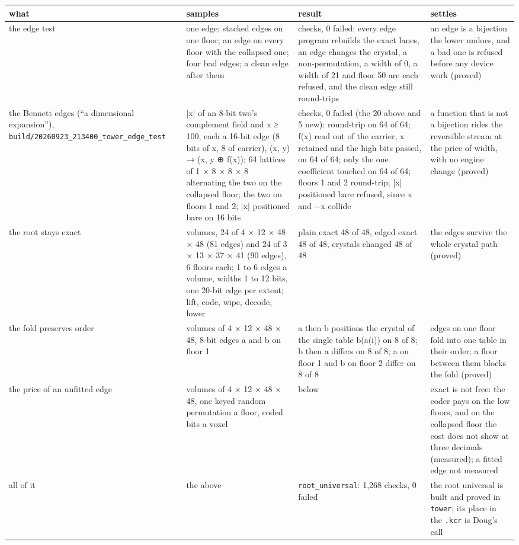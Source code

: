 {\footnotesize
\setlength{\tabcolsep}{6pt}
\begin{longtable}{>{\RaggedRight\arraybackslash}p{}>{\RaggedRight\arraybackslash}p{}>{\RaggedRight\arraybackslash}p{}>{\RaggedRight\arraybackslash}p{}}
\toprule
what & samples & result & settles \\
\midrule
\endhead
the edge test & one edge; stacked edges on one floor; an edge on every floor with the collapsed one; four bad edges; a clean edge after them & 20 checks, 0 failed: every edge program rebuilds the exact lanes, an edge changes the crystal, a non-permutation, a width of 0, a width of 21 and floor 50 are each refused, and the clean edge still round-trips & an edge is a bijection the lower undoes, and a bad one is refused before any device work (proved) \\
the Bennett edges (“a dimensional expansion”), \texttt{build/\allowbreak{}20260923\_\allowbreak{}213400\_\allowbreak{}tower\_\allowbreak{}edge\_\allowbreak{}test} & |x| of an 8-bit two's complement field and x ≥ 100, each a 16-bit edge (8 bits of x, 8 of carrier), (x, y) → (x, y ⊕ f(x)); 64 lattices of 1 × 8 × 8 × 8 alternating the two on the collapsed floor; the two on floors 1 and 2; |x| positioned bare on 16 bits & 25 checks, 0 failed (the 20 above and 5 new): round-trip on 64 of 64; f(x) read out of the carrier, x retained and the high bits passed, on 64 of 64; only the one coefficient touched on 64 of 64; floors 1 and 2 round-trip; |x| positioned bare refused, since x and −x collide & a function that is not a bijection rides the reversible stream at the price of width, with no engine change (proved) \\
the root stays exact & 48 volumes, 24 of 4 × 12 × 48 × 48 (81 edges) and 24 of 3 × 13 × 37 × 41 (90 edges), 6 floors each; 1 to 6 edges a volume, widths 1 to 12 bits, one 20-bit edge per extent; lift, code, wipe, decode, lower & plain exact 48 of 48, edged exact 48 of 48, crystals changed 48 of 48 & the edges survive the whole crystal path (proved) \\
the fold preserves order & 8 volumes of 4 × 12 × 48 × 48, 8-bit edges a and b on floor 1 & a then b positions the crystal of the single table b(a(i)) on 8 of 8; b then a differs on 8 of 8; a on floor 1 and b on floor 2 differ on 8 of 8 & edges on one floor fold into one table in their order; a floor between them blocks the fold (proved) \\
the price of an unfitted edge & 8 volumes of 4 × 12 × 48 × 48, one keyed random permutation a floor, coded bits a voxel & below & exact is not free: the coder pays on the low floors, and on the collapsed floor the cost does not show at three decimals (measured); a fitted edge not measured \\
all of it & the above & \texttt{root\_\allowbreak{}universal}: 1,268 checks, 0 failed & the root universal is built and proved in \texttt{tower}; its place in the \texttt{.\allowbreak{}kcr} is Doug's call \\
\bottomrule
\end{longtable}
}

